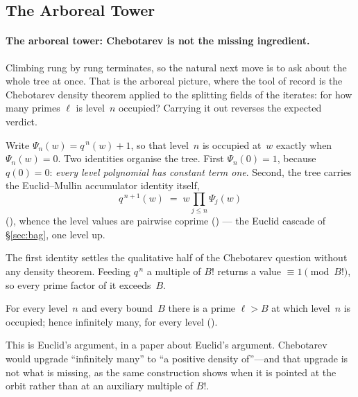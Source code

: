 \subsection{The Arboreal Tower}
\label{sec:arboreal}

\paragraph{The arboreal tower: Chebotarev is not the missing ingredient.}
Climbing rung by rung terminates, so the natural next move is to ask about
the whole tree at once.  That is the arboreal picture, where the tool of
record is the Chebotarev density theorem applied to the splitting fields of
the iterates: for how many primes $\ell$ is level~$n$ occupied?  Carrying
it out reverses the expected verdict.

Write $\Psi_n(w) = q^{\,n}(w)+1$, so that level~$n$ is occupied at~$w$
exactly when $\Psi_n(w) = 0$.  Two identities organise the tree.  First
$\Psi_n(0) = 1$, because $q(0)=0$: \emph{every level polynomial has
constant term one}.  Second, the tree carries the Euclid--Mullin
accumulator identity itself,
\begin{equation}
\label{eq:tree-accumulator}
  q^{\,n+1}(w) \;=\; w \prod_{j \leq n} \Psi_j(w)
\end{equation}
(),
whence the level values are pairwise coprime
() --- the
Euclid cascade of \S\ref{sec:bag}, one level up.

The first identity settles the qualitative half of the Chebotarev question
without any density theorem.  Feeding $q^{\,n}$ a multiple of $B!$ returns
a value $\equiv 1 \pmod{B!}$, so every prime factor of it exceeds~$B$.

\begin{theorem}
\label{thm:arboreal-existence}
For every level~$n$ and every bound~$B$ there is a prime $\ell > B$ at which
level~$n$ is occupied; hence infinitely many, for every level
().
\end{theorem}

\noindent
This is Euclid's argument, in a paper about Euclid's argument.  Chebotarev
would upgrade ``infinitely many'' to ``a positive density of''---and that
upgrade is not what is missing, as the same construction shows when it is
pointed at the orbit rather than at an auxiliary multiple of $B!$.

